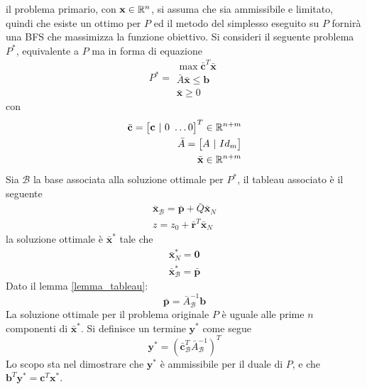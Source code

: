 \documentclass[10pt, letterpaper]{report}
\begin{document}
il problema primario, con $\mathbf x \in {\mathbb R}^n$, si assuma che sia ammissibile e limitato, quindi che esiste un ottimo per $P$ ed il metodo del simplesso eseguito su $P$ fornirà una BFS che massimizza la funzione obiettivo. Si consideri il seguente problema $P^*$, equivalente a $P$ ma in forma di equazione
$$ P^*=\begin{matrix}
    \max \bar {\mathbf c}^T\bar {\mathbf x}\\ 
        \bar A\bar {\mathbf x} \le \mathbf b \\ 
        \bar {\mathbf x} \ge 0 
\end{matrix}$$
con \begin{eqnarray*}
    \bar {\mathbf c} = \begin{bmatrix}
        \mathbf c \ | \ 0 \ \dots 0 
    \end{bmatrix}^T \in {\mathbb R}^{n+m}\\ 
    \bar A = \begin{bmatrix}
        A \ | \ Id_m 
    \end{bmatrix}\\ \bar {\mathbf x}\in {\mathbb R}^{n+m}
\end{eqnarray*}
Sia $\mathcal B$ la base associata alla soluzione ottimale per $P^*$, il tableau associato è il seguente \begin{eqnarray*}
    \bar {\mathbf x}_{\mathcal B}= \bar {\mathbf p}+\bar Q  \bar {\mathbf x}_{N}\\ 
    z=z_0+\bar {\mathbf r}^T \bar {\mathbf x}_{N}
\end{eqnarray*}
la soluzione ottimale è $ \bar {\mathbf x}^*$ tale che \begin{eqnarray*}
    \bar {\mathbf x}^*_N=\mathbf 0 \\ 
    \bar {\mathbf x}^*_{\mathcal B} = \bar {\mathbf p}
\end{eqnarray*}
Dato il lemma \ref{lemma_tableau}: 
$$\bar {\mathbf p}=\bar A^{-1}_{\mathcal B}\mathbf b $$
La soluzione ottimale per il problema originale $P$ è uguale alle prime $n$ componenti di $ \bar {\mathbf x}^*$. Si definisce un termine $\mathbf y^*$ come segue \begin{equation}
    \mathbf y^*=( \bar {\mathbf c}^T_{\mathcal{B}}\bar A^{-1}_{\mathcal B})^T
\end{equation}
Lo scopo sta nel dimostrare che $\mathbf y^*$ è ammissibile per il duale di $P$, e che $\mathbf b^T\mathbf y^*=\mathbf c^T\mathbf x^*$.\bigskip 
\end{document}
